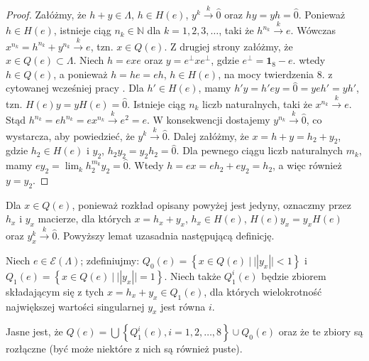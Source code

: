 {\begin{proof}
    Załóżmy, że $h + y \in \Lambda$, $h \in H(e)$, $y^{k}  \overset{k}{\rightarrow}  \hat{0}$
    oraz $hy = yh = \hat{0}$.
Ponieważ $h \in H(e)$, istnieje ciąg $n_{k} \in \mathbb{N}$ dla $k =1,2,3,\ldots$,
taki że $h^{n_{k}} \overset{k}{\rightarrow} e$.
Wówczas $x^{n_{k}}  = h^{n_{k}} + y^{n_{k}}  \overset{k}{\rightarrow}  e$, tzn.
    $x \in Q(e)$.
Z drugiej strony
załóżmy, że $x \in Q(e) \subset \Lambda$.
Niech $h = e x e$ oraz $y = e^{\perp} x e^{\perp}$,
gdzie $e^{\perp} = \mathbf{1}_{8} - e$.
wtedy $h \in Q(e)$, a ponieważ
    $h =  h e = e h$,
    $h \in H(e)$, na mocy twierdzenia 8. z cytowanej wcześniej pracy
    \cite{schwarz1955hausdorff}.
Dla $h' \in H(e)$, mamy
    $h' y = h' e y = \hat{0} = y e h' = yh'$,
tzn. $H(e) y = y H (e) = \hat{0}$.
Istnieje ciąg $n_{k}$ liczb naturalnych, taki że
    $x^{n_{k}}  \overset{k}{\rightarrow}  e$.
Stąd
    $h^{n_{k}} = e h^{n_{k}}  = e x^{n_{k}}  \overset{k}{\rightarrow} e^{2}  = e$.
W konsekwencji dostajemy $y^{n_{k}}  \overset{k}{\rightarrow}  \hat{0}$,
co wystarcza, aby powiedzieć, że $y^{k} \overset{k}{\rightarrow} \hat{0}$.
Dalej załóżmy, że $x = h + y = h_{2} + y_{2}$,
    gdzie $h_{2} \in H(e)$ i $y_{2}$,
    $h_{2} y_{2} = y_{2} h_{2} = \hat{0}$.
Dla pewnego ciągu liczb naturalnych $m_{k}$, mamy
    $e y_{2} = \lim_{k} h_{2}^{m_{k}} y_{2} = \hat{0}$.
Wtedy $h = e x = e h_{2} + e y_{2} = h_{2}$, a więc również $y = y_{2}$.
\end{proof}

Dla $x \in Q(e)$, ponieważ rozkład opisany powyżej jest jedyny,
oznaczmy przez $h_{x}$ i $y_{x}$ macierze, dla których
$x = h_{x} + y_{x}$,
$h_{x} \in H(e)$, $H(e) y_{x} = y_{x} H(e)$ oraz
$y_{x}^{k} \overset{k}{\rightarrow} \hat{0}$.
Powyższy lemat uzasadnia następującą definicję.

\begin{Definition}
    Niech $e \in \mathcal{E}(\Lambda)$;
    zdefiniujmy:
    $Q_{0}(e) = \left \{ x \in Q(e) \: | \: || y_{x} || < 1 \right \}$ i
    $Q_{1}(e) = \left \{ x \in Q(e) \: | \: || y_{x} || = 1 \right \}$.
    Niech także $Q_{1}^{i}(e)$ będzie zbiorem składającym się z tych
    $x = h_{x} + y_{x} \in Q_{1}(e)$,
    dla których wielokrotność największej wartości singularnej $y_{x}$
    jest równa $i$.
\end{Definition}

Jasne jest, że
$Q(e) = \bigcup \left \{ Q_{1}^{i}(e), i=1,2,\ldots,8 \right \} \cup Q_{0}(e)$
oraz że te zbiory są rozłączne (być może niektóre z nich są również puste).

}
